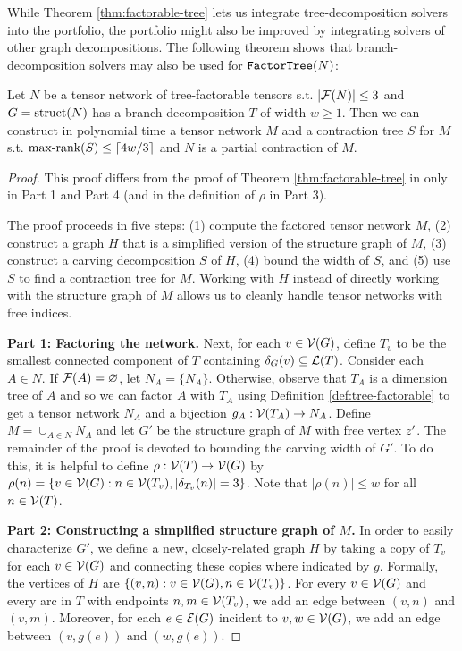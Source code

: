 While Theorem \ref{thm:factorable-tree} lets us integrate tree-decomposition solvers into the portfolio, the portfolio might also be improved by integrating solvers of other graph decompositions. The following theorem shows that branch-decomposition solvers may also be used for $\texttt{\upshape FactorTree}(N)$:
\begin{theorem} \label{thm:factorable-branch}
Let $N$ be a tensor network of tree-factorable tensors s.t. $|\mathcal{F}(N)| \leq 3$ and $G=\text{struct}(N)$ has a branch decomposition $T$ of width $w \geq 1$. Then we can construct in polynomial time a tensor network $M$ and a contraction tree $S$ for $M$ s.t. $\text{max-rank}(S) \leq \lceil4w/3\rceil$ and $N$ is a partial contraction of $M$.
\end{theorem}
\begin{proof}
This proof differs from the proof of Theorem \ref{thm:factorable-tree} in \cite{DDV19} only in Part 1 and Part 4 (and in the definition of $\rho$ in Part 3).

The proof proceeds in five steps: (1) compute the factored tensor network $M$, (2) construct a graph $H$ that is a simplified version of the structure graph of $M$, (3) construct a carving decomposition $S$ of $H$, (4) bound the width of $S$, and (5) use $S$ to find a contraction tree for $M$. Working with $H$ instead of directly working with the structure graph of $M$ allows us to cleanly handle tensor networks with free indices.

\textbf{Part 1: Factoring the network.}
Next, for each $v \in \mathcal{V}(G)$, define $T_v$ to be the smallest connected component of $T$ containing $\delta_{G}(v) \subseteq \mathcal{L}(T)$. Consider each $A \in N$. If $\mathcal{F}(A) = \varnothing$, let $N_A = \{N_A\}$. Otherwise, observe that $T_A$ is a dimension tree of $A$ and so we can factor $A$ with $T_A$ using Definition \ref{def:tree-factorable} to get a tensor network $N_A$ and a bijection $g_A: \mathcal{V}(T_A) \rightarrow N_A$. Define $M = \cup_{A \in N} N_A$ and let $G'$ be the structure graph of $M$ with free vertex $z'$. The remainder of the proof is devoted to bounding the carving width of $G'$. To do this, it is helpful to define $\rho: \mathcal{V}(T) \rightarrow \mathcal{V}(G)$ by $\rho(n) = \{ v \in \mathcal{V}(G) : n \in \mathcal{V}(T_v), |\delta_{T_v}(n)| = 3\}$. Note that $|\rho(n)| \leq w$ for all $n \in \mathcal{V}(T)$.

\textbf{Part 2: Constructing a simplified structure graph of $M$.} In order to easily characterize $G'$, we define a new, closely-related graph $H$ by taking a copy of $T_v$ for each $v \in \mathcal{V}(G)$ and connecting these copies where indicated by $g$. Formally, the vertices of $H$ are $\{(v, n) : v \in \mathcal{V}(G), n \in \mathcal{V}(T_v)\}$. For every $v \in \mathcal{V}(G)$ and every arc in $T$ with endpoints $n, m \in \mathcal{V}(T_v)$, we add an edge between $(v, n)$ and $(v, m)$. Moreover, for each $e \in \mathcal{E}(G)$ incident to $v, w \in \mathcal{V}(G)$, we add an edge between $(v, g(e))$ and $(w, g(e))$. 


\end{proof}

